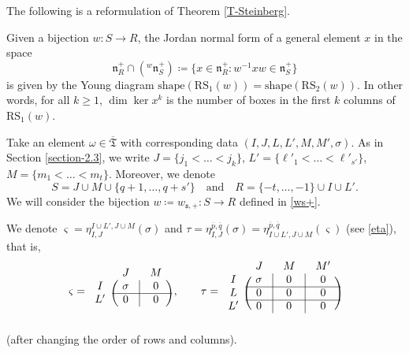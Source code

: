 \documentclass[ALCO,Unicode]{cedram}
\newcommand{\fs}{\mathfrak{s}}
\newcommand{\fn}{\mathfrak{n}}
\newcommand{\RS}{\mathrm{RS}}
\newcommand{\shape}{\mathrm{shape}}
\newcommand{\Mat}{\mathrm{M}}
\newcommand{\intp}{\overline{p}}
\newcommand{\intq}{\overline{q}}
\newcommand{\ppermutationsof}{\mathfrak{T}}
\newcommand{\parameters}{\overline{\ppermutationsof}}
\newcommand{\mC}{\mathbb{C}}
\begin{document}
The following is a reformulation of Theorem \ref{T-Steinberg}.

\begin{prop}
\label{P4.6}
Given a bijection $w: S\to R$, the Jordan normal form of a general element $x$ in the space
\[
\fn_R^+\cap({}^w\fn_S^+)\coloneqq \{x\in\fn_R^+:w^{-1}xw\in\fn_S^+\}
\]
is given by the Young diagram $\shape(\RS_1(w))=\shape(\RS_2(w))$. In other words, for all $k\geq 1$, $\dim \ker x^k$ is the number of boxes in the first $k$ columns of $\RS_1(w)$.\end{prop}

Take an element $\omega\in\parameters$ with corresponding data $(I,J,L,L',M,M',\sigma)$. As in Section \ref{section-2.3}, we write $J=\{j_1<\ldots<j_k\}$, $L'=\{\ell'_1<\ldots<\ell'_{s'}\}$, $M=\{m_1<\ldots<m_t\}$.
Moreover, we denote
\[
S=J\cup M\cup \{q+1,\ldots,q+s'\}\quad\mbox{and}\quad
 R=\{-t,\ldots,-1\}\cup I\cup L'.
\]
We will consider the bijection $w\coloneqq w_{\fs,+}:S\to R$ defined in \eqref{ws+}.


We denote $\varsigma=\eta_{I,J}^{I\cup L',J\cup M}(\sigma)$ and $\tau=\eta_{I,J}^{\intp,\intq}(\sigma)=\eta_{I\cup L',J\cup M}^{\intp,\intq}(\varsigma)$ (see \eqref{eta}), that is,
\begin{equation}
\label{zeta-tau}
\varsigma=\begin{blockarray}{ccc}
{} & {\ J\ } & {\ M\ }\\
\begin{block}{c(c|c)}
I & \sigma & 0\\
\cline{2-3}
L' & 0 & 0\\
\end{block}
\end{blockarray}\,,\qquad \tau=\begin{blockarray}{cccc}
{} & {\ J\ } & {\ M\ } & {\ M'\ }\\
\begin{block}{c(c|c|c)}
I & \sigma & 0 & 0\\
\cline{2-4}
L & 0 & 0 & 0\\
\cline{2-4}
L' & 0 & 0 & 0\\
\end{block}
\end{blockarray}
\end{equation}
(after changing the order of rows and columns).
\end{document}
